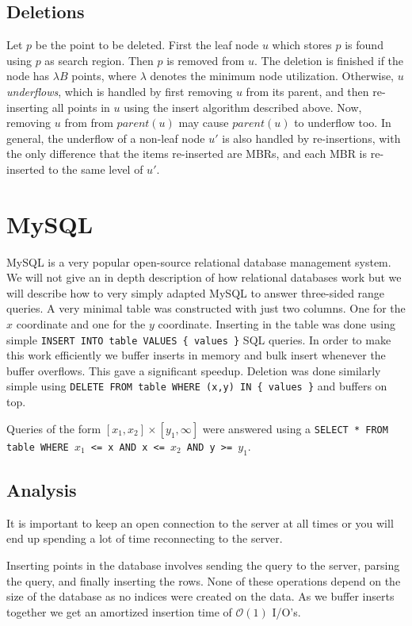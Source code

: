 \documentclass[twoside,11pt,openright]{report}
\begin{document}
\subsection{Deletions}
Let $p$ be the point to be deleted. First the leaf node $u$ which stores $p$ is found using $p$ as search region. Then $p$ is removed from $u$. The deletion is finished if the node has $\lambda B$ points, where $\lambda$ denotes the minimum node utilization. Otherwise, $u$ \textit{underflows}, which is handled by first removing $u$ from its parent, and then re-inserting all points in $u$ using the insert algorithm described above. Now, removing $u$ from from $parent(u)$ may cause $parent(u)$ to underflow too. In general, the underflow of a non-leaf node $u'$ is also handled by re-insertions, with the only difference that the items re-inserted are MBRs, and each MBR is re-inserted to the same level of $u'$.

\section{MySQL}
\label{sec:mysql}
MySQL is a very popular open-source relational database management system. We will not give an in depth description of how relational databases work but we will describe how to very simply adapted MySQL to answer three-sided range queries. A very minimal table was constructed with just two columns. One for the $x$ coordinate and one for the $y$ coordinate. Inserting in the table was done using simple \texttt{INSERT INTO table VALUES \{ values \}} SQL queries. In order to make this work efficiently we buffer inserts in memory and bulk insert whenever the buffer overflows. This gave a significant speedup. Deletion was done similarly simple using \texttt{DELETE FROM table WHERE (x,y) IN \{ values \}} and buffers on top.

Queries of the form $\left[x_1,x_2\right] \times \left[y_1,\infty\right]$ were answered using a \texttt{SELECT * FROM table WHERE $x_1$ <= x AND x <= $x_2$ AND y >= $y_1$}.

\subsection{Analysis}
It is important to keep an open connection to the server at all times or you will end up spending a lot of time reconnecting to the server.

Inserting points in the database involves sending the query to the server, parsing the query, and finally inserting the rows. None of these operations depend on the size of the database as no indices were created on the data. As we buffer inserts together we get an amortized insertion time of $\mathcal{O}(1)$ I/O's.
\end{document}
